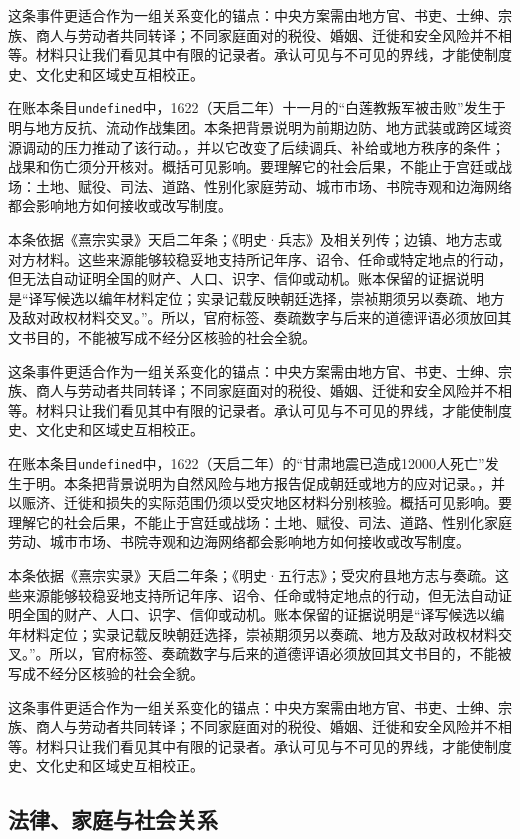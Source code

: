 这条事件更适合作为一组关系变化的锚点：中央方案需由地方官、书吏、士绅、宗族、商人与劳动者共同转译；不同家庭面对的税役、婚姻、迁徙和安全风险并不相等。材料只让我们看见其中有限的记录者。承认可见与不可见的界线，才能使制度史、文化史和区域史互相校正。

在账本条目\texttt{undefined}中，1622（天启二年）十一月的“白莲教叛军被击败”发生于明与地方反抗、流动作战集团。本条把背景说明为前期边防、地方武装或跨区域资源调动的压力推动了该行动。，并以它改变了后续调兵、补给或地方秩序的条件；战果和伤亡须分开核对。概括可见影响。要理解它的社会后果，不能止于宫廷或战场：土地、赋役、司法、道路、性别化家庭劳动、城市市场、书院寺观和边海网络都会影响地方如何接收或改写制度。

本条依据《熹宗实录》天启二年条；《明史·兵志》及相关列传；边镇、地方志或对方材料。这些来源能够较稳妥地支持所记年序、诏令、任命或特定地点的行动，但无法自动证明全国的财产、人口、识字、信仰或动机。账本保留的证据说明是“译写候选以编年材料定位；实录记载反映朝廷选择，崇祯期须另以奏疏、地方及敌对政权材料交叉。”。所以，官府标签、奏疏数字与后来的道德评语必须放回其文书目的，不能被写成不经分区核验的社会全貌。

这条事件更适合作为一组关系变化的锚点：中央方案需由地方官、书吏、士绅、宗族、商人与劳动者共同转译；不同家庭面对的税役、婚姻、迁徙和安全风险并不相等。材料只让我们看见其中有限的记录者。承认可见与不可见的界线，才能使制度史、文化史和区域史互相校正。

在账本条目\texttt{undefined}中，1622（天启二年）的“甘肃地震已造成12000人死亡”发生于明。本条把背景说明为自然风险与地方报告促成朝廷或地方的应对记录。，并以赈济、迁徙和损失的实际范围仍须以受灾地区材料分别核验。概括可见影响。要理解它的社会后果，不能止于宫廷或战场：土地、赋役、司法、道路、性别化家庭劳动、城市市场、书院寺观和边海网络都会影响地方如何接收或改写制度。

本条依据《熹宗实录》天启二年条；《明史·五行志》；受灾府县地方志与奏疏。这些来源能够较稳妥地支持所记年序、诏令、任命或特定地点的行动，但无法自动证明全国的财产、人口、识字、信仰或动机。账本保留的证据说明是“译写候选以编年材料定位；实录记载反映朝廷选择，崇祯期须另以奏疏、地方及敌对政权材料交叉。”。所以，官府标签、奏疏数字与后来的道德评语必须放回其文书目的，不能被写成不经分区核验的社会全貌。

这条事件更适合作为一组关系变化的锚点：中央方案需由地方官、书吏、士绅、宗族、商人与劳动者共同转译；不同家庭面对的税役、婚姻、迁徙和安全风险并不相等。材料只让我们看见其中有限的记录者。承认可见与不可见的界线，才能使制度史、文化史和区域史互相校正。

\subsection{法律、家庭与社会关系}

